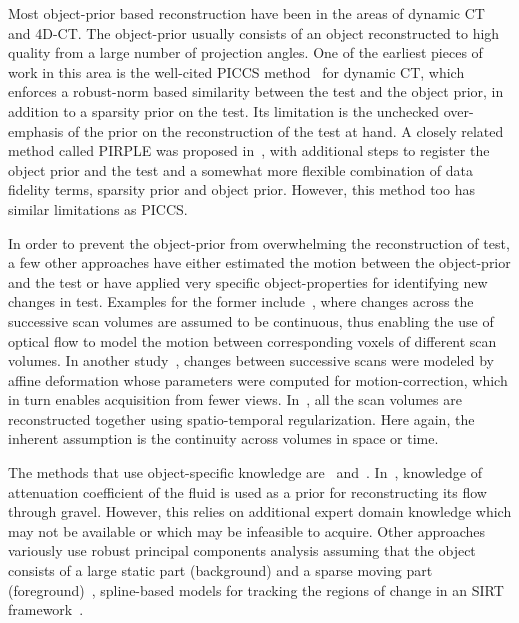 \documentclass[journal]{IEEEtran}
\begin{document}
Most object-prior based reconstruction have been in the areas of
dynamic CT and 4D-CT. %
The object-prior usually consists of an object reconstructed to high
quality from a large number of projection angles. One of the earliest
pieces of work in this area is the well-cited PICCS
method~\cite{PICCS} for dynamic CT, which enforces a robust-norm based
similarity between the test and the object prior, in addition to a
sparsity prior on the test. Its limitation is the unchecked
over-emphasis of the prior on the reconstruction of the test at
hand. A closely related method called PIRPLE was proposed
in~\cite{pirple}, with additional steps to register the object prior
and the test and a somewhat more flexible combination of data fidelity
terms, sparsity prior and object prior. However, this method too has
similar limitations as PICCS.

In order to prevent the object-prior from overwhelming the
reconstruction of test, a few other approaches have either estimated
the motion between the object-prior and the test or have applied very
specific object-properties for identifying new changes in test.
Examples for the former include~\cite{koen2020}, where changes across
the successive scan volumes are assumed to be continuous, thus
enabling the use of optical flow to model the motion between
corresponding voxels of different scan volumes. In another
study~\cite{vincent2017}, changes between successive scans were
modeled by affine deformation whose parameters were computed for
motion-correction, which in turn enables acquisition from fewer
views. In~\cite{daniil2015}, all the scan volumes are reconstructed
together using spatio-temporal regularization. Here again, the
inherent assumption is the continuity across volumes in space or time.

The methods that use object-specific knowledge are~\cite{Van2015}
and~\cite{Marjolein2016}.  In~\cite{Van2015}, knowledge of attenuation
coefficient of the fluid is used as a prior for reconstructing its
flow through gravel. However, this relies on additional expert domain
knowledge which may not be available or which may be infeasible to
acquire. Other approaches variously use robust principal components
analysis assuming that the object consists of a large static part
(background) and a sparse moving part (foreground)~\cite{HaoGao},
spline-based models for tracking the regions of change in an SIRT
framework~\cite{Van2014}.
\end{document}
